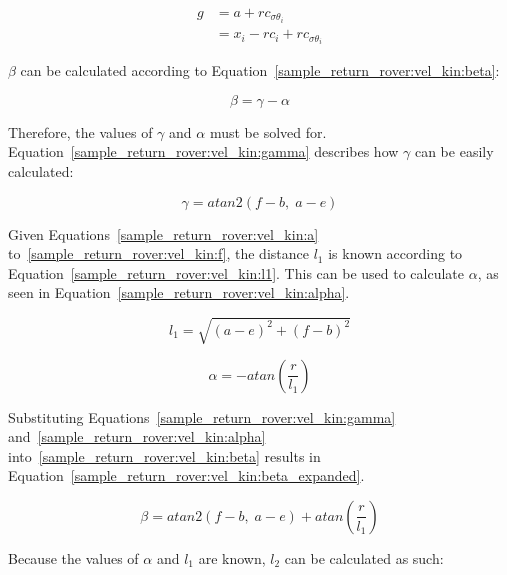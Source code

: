 \begin{equation}\label{sample_return_rover:vel_kin:g_sigma}
	\begin{split}
		g & = a + rc_{\sigma\theta_{i}} \\
		& = x_{i} - rc_{i} + rc_{\sigma\theta_{i}}
	\end{split}
\end{equation}

$\beta$ can be calculated according to Equation~\ref{sample_return_rover:vel_kin:beta}:

\begin{equation}\label{sample_return_rover:vel_kin:beta}
	\beta = \gamma - \alpha
\end{equation}

Therefore, the values of $\gamma$ and $\alpha$ must be solved for. Equation~\ref{sample_return_rover:vel_kin:gamma} describes how $\gamma$ can be easily calculated:

\begin{equation}\label{sample_return_rover:vel_kin:gamma}
	\gamma = atan2(f-b, \; a-e)
\end{equation}

Given Equations~\ref{sample_return_rover:vel_kin:a} to~\ref{sample_return_rover:vel_kin:f}, the distance $l_{1}$ is known according to Equation~\ref{sample_return_rover:vel_kin:l1}. This can be used to calculate $\alpha$, as seen in Equation~\ref{sample_return_rover:vel_kin:alpha}.

\begin{equation}\label{sample_return_rover:vel_kin:l1}
	l_{1} = \sqrt{(a-e)^2 + (f-b)^2}
\end{equation}

\begin{equation}\label{sample_return_rover:vel_kin:alpha}
	\alpha = -atan\left(\frac{r}{l_{1}}\right)
\end{equation}

Substituting Equations~\ref{sample_return_rover:vel_kin:gamma} and~\ref{sample_return_rover:vel_kin:alpha} into~\ref{sample_return_rover:vel_kin:beta} results in Equation~\ref{sample_return_rover:vel_kin:beta_expanded}.

\begin{equation}\label{sample_return_rover:vel_kin:beta_expanded}
	\beta = atan2(f-b, \; a-e) + atan\left(\frac{r}{l_{1}}\right)
\end{equation}

Because the values of $\alpha$ and $l_{1}$ are known, $l_{2}$ can be calculated as such:

